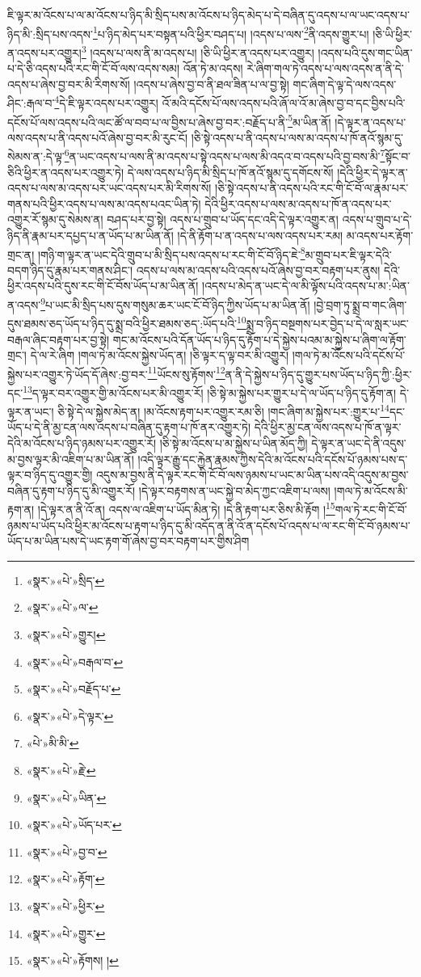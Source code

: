 ཇི་ལྟར་མ་འོངས་པ་ལ་མ་འོངས་པ་ཉིད་མི་སྲིད་པས་མ་འོངས་པ་ཉིད་མེད་པ་དེ་བཞིན་དུ་འདས་པ་ལ་ཡང་འདས་པ་ཉིད་མི་:སྲིད་པས་འདས་\footnote{«སྣར་»«པེ་»སྲིད་}པ་ཉིད་མེད་པར་བསྟན་པའི་ཕྱིར་བཤད་པ། །འདས་པ་ལས་\footnote{«སྣར་»«པེ་»ལ་}ནི་འདས་གྱུར་པ། །ཅི་ཡི་ཕྱིར་ན་འདས་པར་འགྱུར།\footnote{«སྣར་»«པེ་»གྱུར།} །འདས་པ་ལས་ནི་མ་འདས་པ། །ཅི་ཡི་ཕྱིར་ན་འདས་པར་འགྱུར། །འདས་པའི་དུས་གང་ཡིན་པ་དེ་ཅི་འདས་པའི་རང་གི་ངོ་བོ་ལས་འདས་སམ། འོན་ཏེ་མ་འདས། རེ་ཞིག་གལ་ཏེ་འདས་པ་ལས་འདས་ན་ནི་དེ་འདས་པ་ཞེས་བྱ་བར་མི་རིགས་སོ། །འདས་པ་ཞེས་བྱ་བ་ནི་ཐལ་ཟིན་པ་ལ་བྱ་སྟེ། གང་ཞིག་དེ་ལྟ་དེ་ལས་འདས་ཤིང་:རྒལ་བ་\footnote{«སྣར་»«པེ་»བརྒལ་བ་}དེ་ཇི་ལྟར་འདས་པར་འགྱུར། འོ་མའི་དངོས་པོ་ལས་འདས་པའི་ཞོ་ལ་འོ་མ་ཞེས་བྱ་བ་དང་བྱིས་པའི་དངོས་པོ་ལས་འདས་པའི་ལང་ཚོ་ལ་བབ་པ་ལ་བྱིས་པ་ཞེས་བྱ་བར་:བརྗོད་པ་ནི་\footnote{«སྣར་»«པེ་»བརྗོད་པ་}མ་ཡིན་ནོ། །དེ་ལྟར་ན་འདས་པ་ལས་འདས་པ་ནི་འདས་པའོ་ཞེས་བྱ་བར་མི་རུང་ངོ། །ཅི་སྟེ་འདས་པ་ནི་འདས་པ་ལས་མ་འདས་པ་ཁོ་ནའོ་སྙམ་དུ་སེམས་ན་:དེ་ལྟ་\footnote{«སྣར་»«པེ་»དེ་ལྟར་}ན་ཡང་འདས་པ་ལས་ནི་མ་འདས་པ་སྟེ་འདས་པ་ལས་མི་འདའ་བ་འདས་པའི་བྱ་བས་མི་\footnote{«པེ་»མི་མི་}སྟོང་བ་ཅིའི་ཕྱིར་ན་འདས་པར་འགྱུར་ཏེ། དེ་ལས་འདས་པ་ཉིད་མི་སྲིད་པ་ཁོ་ནའོ་སྙམ་དུ་དགོངས་སོ། །དེའི་ཕྱིར་དེ་ལྟར་ན་འདས་པ་ལས་མ་འདས་པར་ཡང་འདས་པར་མི་རིགས་སོ། །ཅི་སྟེ་འདས་པ་ནི་འདས་པའི་རང་གི་ངོ་བོ་ལ་རྣམ་པར་གནས་པའི་ཕྱིར་འདས་པ་ལས་མ་འདས་པའང་ཡིན་ཏེ། དེའི་ཕྱིར་འདས་པ་ལས་མ་འདས་པ་ཁོ་ན་འདས་པར་འགྱུར་རོ་སྙམ་དུ་སེམས་ན། བཤད་པར་བྱ་སྟེ། འདས་པ་གྲུབ་པ་ཡོད་དང་འདི་དེ་ལྟར་འགྱུར་ན། འདས་པ་གྲུབ་པ་དེ་ཉིད་ནི་རྣམ་པར་དཔྱད་པ་ན་ཡོད་པ་མ་ཡིན་ནོ། །དེ་ནི་རྟོག་པ་ན་འདས་པ་ལས་འདས་པར་རམ། མ་འདས་པར་རྟོག་གྲང་ན། །གཉི་ག་ལྟར་ན་ཡང་དེའི་གྲུབ་པ་མི་སྲིད་པས་འདས་པ་རང་གི་ངོ་བོ་ཉིད་ཇེ་\footnote{«སྣར་»«པེ་»རྗེ་}མ་གྲུབ་པར་ཇི་ལྟར་དེའི་བདག་ཉིད་དུ་རྣམ་པར་གནས་ཤིང་། འདས་པ་ལས་མ་འདས་པའི་འདས་པའོ་ཞེས་བྱ་བར་བརྟག་པར་ནུས། དེའི་ཕྱིར་འདས་པའི་དུས་རང་གི་ངོ་བོས་ཡོད་པ་མ་ཡིན་ནོ། །འདས་པ་མེད་ན་ཡང་དེ་ལ་མི་ལྟོས་པའི་འདས་པ་མ་:ཡིན་ན་འདས་\footnote{«སྣར་»«པེ་»ཡིན་}པ་ཡང་མི་སྲིད་པས་དུས་གསུམ་ཆར་ཡང་ངོ་བོ་ཉིད་ཀྱིས་ཡོད་པ་མ་ཡིན་ནོ། །བྱེ་བྲག་ཏུ་སྨྲ་བ་གང་ཞིག་དུས་ཐམས་ཅད་ཡོད་པ་ཉིད་དུ་སྨྲ་བའི་ཕྱིར་ཐམས་ཅད་:ཡོད་པའི་\footnote{«སྣར་»«པེ་»ཡོད་པར་}སྨྲ་བ་ཉིད་བསྔགས་པར་བྱེད་པ་དེ་ལ་སླར་ཡང་བརྒལ་ཞིང་བརྟག་པར་བྱ་སྟེ། གང་མ་འོངས་པའི་དོན་ཡོད་པ་ཉིད་དུ་རྟོག་པ་དེ་སྐྱེས་པའམ་མ་སྐྱེས་པ་ཞིག་ལ་རྟོག་གྲང་། དེ་ལ་རེ་ཞིག །གལ་ཏེ་མ་འོངས་སྐྱེས་ཡོད་ན། །ཅི་ལྟར་ད་ལྟ་བར་མི་འགྱུར། །གལ་ཏེ་མ་འོངས་པའི་དངོས་པོ་སྐྱེས་པར་འགྱུར་ཏེ་ཡོད་དོ་ཞེས་:བྱ་བར་\footnote{«སྣར་»«པེ་»བྱ་བ་}ཡོངས་སུ་རྟོགས་\footnote{«སྣར་»«པེ་»རྟོག་}ན་ནི་དེ་སྐྱེས་པ་ཉིད་དུ་གྱུར་པས་ཡོད་པ་ཉིད་ཀྱི་:ཕྱིར་དང་\footnote{«སྣར་»«པེ་»ཕྱིར་}ད་ལྟར་བར་འགྱུར་གྱི་མ་འོངས་པར་མི་འགྱུར་རོ། །ཅི་སྟེ་མ་སྐྱེས་པར་གྱུར་པ་དེ་ལ་ཡོད་པ་ཉིད་དུ་རྟོག་ན། དེ་ལྟར་ན་ཡང་། ཅི་སྟེ་དེ་ལ་སྐྱེས་མེད་ན། །མ་འོངས་རྟག་པར་འགྱུར་རམ་ཅི། །གང་ཞིག་མ་སྐྱེས་པར་:གྱུར་པ་\footnote{«སྣར་»«པེ་»གྱུར་}དང་ཡོད་པ་དེ་ནི་མྱ་ངན་ལས་འདས་པ་བཞིན་དུ་རྟག་པ་ཁོ་ནར་འགྱུར་ཏེ། དེའི་ཕྱིར་མྱ་ངན་ལས་འདས་པ་ཁོ་ན་ལྟར་དེའི་མ་འོངས་པ་ཉིད་ཉམས་པར་འགྱུར་རོ། །ཅི་སྟེ་མ་འོངས་པ་མ་སྐྱེས་པ་ཡིན་མོད་ཀྱི། དེ་ལྟར་ན་ཡང་དེ་ནི་འདུས་མ་བྱས་ལྟར་མི་འཇིག་པ་མ་ཡིན་ནོ། །འདི་ལྟར་རྒྱུ་དང་རྐྱེན་རྣམས་ཀྱིས་དེའི་མ་འོངས་པའི་དངོས་པོ་ཉམས་པས་ད་ལྟར་བ་ཉིད་དུ་འགྱུར་གྱི། འདུས་མ་བྱས་ནི་དེ་ལྟར་རང་གི་ངོ་བོ་ལས་ཉམས་པ་ཡང་མ་ཡིན་པས་འདི་འདུས་མ་བྱས་བཞིན་དུ་རྟག་པ་ཉིད་དུ་མི་འགྱུར་རོ། །དེ་ལྟར་བརྟགས་ན་ཡང་སྐྱེ་བ་མེད་ཀྱང་འཇིག་པ་ལས། །གལ་ཏེ་མ་འོངས་མི་རྟག་ན། །དེ་ལྟར་ན་ནི་འོ་ན། འདས་ལ་འཇིག་པ་ཡོད་མིན་ཏེ། །དེ་ནི་རྟག་པར་ཅིས་མི་རྟོག །\footnote{«སྣར་»«པེ་»རྟོགས། །}གལ་ཏེ་རང་གི་ངོ་བོ་ཉམས་པ་ཡོད་པའི་ཕྱིར་མ་འོངས་པ་རྟག་པ་ཉིད་དུ་མི་འདོད་ན་ནི་འོ་ན་དངོས་པོ་འདས་པ་ལ་རང་གི་ངོ་བོ་ཉམས་པ་ཡོད་པ་མ་ཡིན་པས་དེ་ཡང་རྟག་གོ་ཞེས་བྱ་བར་བརྟག་པར་གྱིས་ཤིག 